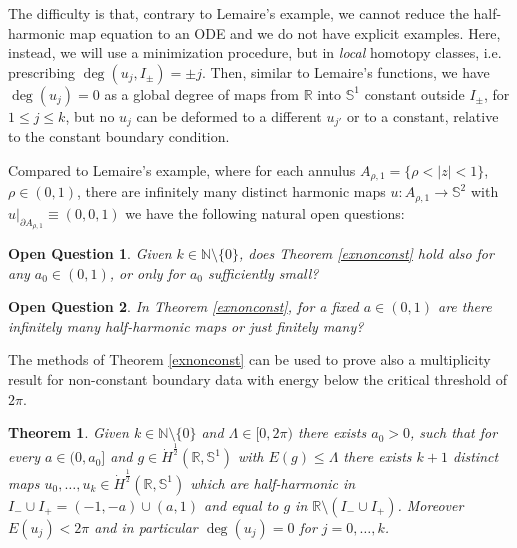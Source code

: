 \documentclass[12pt, a4paper]{article}
\newtheorem{thm}{Theorem}[section]
\newtheorem{pb}{Open Question}
\newcommand{\sph}{\mathbb{S}}
\newcommand{\R}{\mathbb{R}}
\newcommand{\blu}[1]{{\color{blue}#1}}
\newcommand{\red}[1]{{\color{red}#1}}
\renewcommand{\(}{\left(}
\renewcommand{\)}{\right)}
\begin{document}
The difficulty is that, contrary to Lemaire's example, we cannot reduce the half-harmonic map equation to an ODE and we do not have explicit examples. Here, instead, we will  use a minimization procedure, but in \emph{local} homotopy classes, i.e. prescribing $\deg(u_j, I_\pm)= \pm j$. Then, similar to Lemaire's functions, we have $\deg(u_j)=0$ as a global degree of maps from $\R$ into $\sph^1$ constant outside  $I_\pm$, for $1\le j\le k$, but no $u_j$ can be deformed to a different $u_{j'}$ or to a constant, relative to the constant boundary condition.

\medskip

Compared to Lemaire's example, where for each annulus $A_{\rho,1}=\{\rho<|z|<1\}$, $\rho\in (0,1)$, there are infinitely many distinct harmonic maps $u:A_{\rho,1}\to \sph^2$ with $u|_{\partial A_{\rho,1}}\equiv (0,0,1)$ we have the following natural open questions:

\begin{pb} {Given $k\in \mathbb{N}\setminus \{0\}$}, does Theorem \ref{exnonconst} hold also for \emph{any} $a_0\in (0,1)$, or only for $a_0$ sufficiently small?
\end{pb} 

\begin{pb} In Theorem \ref{exnonconst}, for a fixed $a\in (0,1)$ are there infinitely many half-harmonic maps or just finitely many?
\end{pb}


\medskip

The methods of Theorem \ref{exnonconst} can be used to prove also a multiplicity result for non-constant boundary data with energy below the critical threshold of $2\pi$.

 \begin{thm}\label{exk} Given {$k\in \mathbb{N}\setminus \{0\}$}  and $\Lambda\in [0,2\pi)$ there exists $a_0>0$, such that for every $a\in (0,a_0]$ and $g\in \dot H^{\frac12}(\R,\sph^1)$ with $E(g)\le\Lambda$  there exists $k+1$ distinct maps $u_0,\dots, u_k\in \dot H^{\frac12}(\R,\sph^1)$ which are half-harmonic in $I_-\cup I_+=(-1,-a)\cup (a,1)$ and equal to $g$ in $\R\setminus (I_-\cup I_+)$. Moreover $E(u_j)<2\pi$ and in particular $\deg(u_j)=0$ for $j=0,\dots,k$.
 \end{thm}

\end{document}
